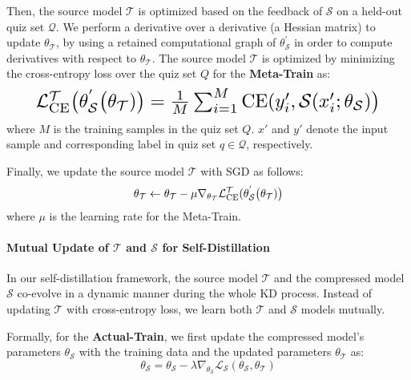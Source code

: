 \documentclass[11pt]{article}
\begin{document}
Then, the source model $\mathcal{T}$ is optimized based on the feedback of $\mathcal{S}$ on a held-out quiz set $\mathcal{Q}$. We perform a derivative over a derivative (a Hessian matrix) to update $\theta_{\mathcal{T}}$, by using a retained computational graph of $\theta_{\mathcal{S}}^{'}$ 
in order to compute derivatives with respect
to $\theta_{\mathcal{T}}$. The source model $\mathcal{T}$ is optimized by minimizing the cross-entropy loss over the quiz set $Q$  for the \textbf{Meta-Train} as:
\begin{equation}
\label{equation:theta-T-update}
\resizebox{0.89 \hsize}{!}{$\mathcal{L}^{\mathcal{T}}_{\rm CE}\big(\theta_{\mathcal{S}}^{'}\big(\theta_{\mathcal{T}})\big) = \frac{1}{M}\sum_{i=1}^{M}{\rm CE}(y'_i, \mathcal{S}(x'_i; \theta_{\mathcal{S}})\big)$}
\end{equation}
where $M$ is the training samples in the quiz set $Q$. $x'$ and $y'$ denote the input sample and corresponding label in quiz set $q\in \mathcal{Q}$, respectively. 

Finally, we update the source model $\mathcal{T}$ with SGD \cite{bottou2012stochastic} as follows:
\begin{equation}
\label{equation:theta-T-update}
  \theta_{\mathcal{T}} \gets \theta_{\mathcal{T}}-\mu \nabla_{\theta_{\mathcal{T}}} \mathcal{L}^{\mathcal{T}}_{\rm CE}(\theta_{\mathcal{S}}^{'}\big(\theta_{\mathcal{T}})\big)
\end{equation}
where $\mu$ is the learning rate for the Meta-Train. 

\paragraph{Mutual Update of $\mathcal{T}$ and $\mathcal{S}$ for Self-Distillation} 
In our self-distillation framework, the source model $\mathcal{T}$ and the compressed model $\mathcal{S}$ co-evolve in a dynamic manner during the whole KD process. Instead of updating $\mathcal{T}$ with cross-entropy loss, we learn both $\mathcal{T}$ and $\mathcal{S}$ models mutually. 

Formally, for the \textbf{Actual-Train}, we first update the compressed model's parameters $\theta_{\mathcal{S}}$ with the training data and the updated parameters $\theta_{\mathcal{T}}$ as:
\begin{equation}
\theta_{\mathcal{S}} = \theta_{\mathcal{S}} - \lambda \nabla_{\theta_{\mathcal{S}}} \mathcal{L}_{\mathcal{S}}(\theta_{\mathcal{S}},\theta_{\mathcal{T}})
\label{eq:sgd-S}
\end{equation}
\end{document}
